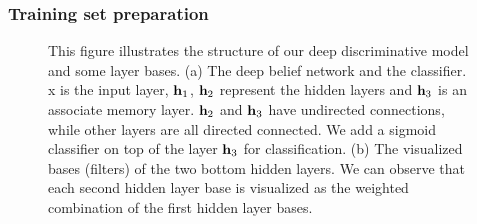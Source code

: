 \documentclass[preprint,12pt,review]{elsarticle}
\begin{document}
\subsubsection{Training set preparation}
%
\begin{figure}[tbp]
\centering
{}
\vspace{-8mm}
\caption{This figure illustrates the structure of our deep discriminative model and some layer bases. (a) The deep belief network and the classifier. x is the input layer, ${{\bf{h}}_1}$, ${{\bf{h}}_2}$ represent the hidden layers and ${{\bf{h}}_3}$ is an associate memory layer.  ${{\bf{h}}_2}$ and ${{\bf{h}}_3}$ have undirected connections, while other layers are all directed connected. We add a sigmoid classifier on top of the layer ${{\bf{h}}_3}$ for classification. (b) The visualized bases (filters) of the two bottom hidden layers. We can observe that each second hidden layer base is visualized as the weighted combination of the first hidden layer bases.}
\label{fig:DBN}
\end{figure}
\end{document}
